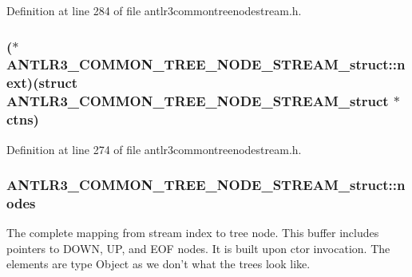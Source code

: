 Definition at line 284 of file antlr3commontreenodestream.\-h.

\hypertarget{struct_a_n_t_l_r3___c_o_m_m_o_n___t_r_e_e___n_o_d_e___s_t_r_e_a_m__struct_a4e17c2be771dd3c3f1a35f9e234cac39}{
\subsubsection[{next}]{($\ast$ A\-N\-T\-L\-R3\-\_\-\-C\-O\-M\-M\-O\-N\-\_\-\-T\-R\-E\-E\-\_\-\-N\-O\-D\-E\-\_\-\-S\-T\-R\-E\-A\-M\-\_\-struct\-::next)(struct {\bf A\-N\-T\-L\-R3\-\_\-\-C\-O\-M\-M\-O\-N\-\_\-\-T\-R\-E\-E\-\_\-\-N\-O\-D\-E\-\_\-\-S\-T\-R\-E\-A\-M\-\_\-struct} $\ast$ctns)}}\label{struct_a_n_t_l_r3___c_o_m_m_o_n___t_r_e_e___n_o_d_e___s_t_r_e_a_m__struct_a4e17c2be771dd3c3f1a35f9e234cac39}


Definition at line 274 of file antlr3commontreenodestream.\-h.

\hypertarget{struct_a_n_t_l_r3___c_o_m_m_o_n___t_r_e_e___n_o_d_e___s_t_r_e_a_m__struct_a9a3951a47f1a5c543d4402e4cb0f64ee}{
\subsubsection[{nodes}]{ A\-N\-T\-L\-R3\-\_\-\-C\-O\-M\-M\-O\-N\-\_\-\-T\-R\-E\-E\-\_\-\-N\-O\-D\-E\-\_\-\-S\-T\-R\-E\-A\-M\-\_\-struct\-::nodes}}\label{struct_a_n_t_l_r3___c_o_m_m_o_n___t_r_e_e___n_o_d_e___s_t_r_e_a_m__struct_a9a3951a47f1a5c543d4402e4cb0f64ee}
The complete mapping from stream index to tree node. This buffer includes pointers to D\-O\-W\-N, U\-P, and E\-O\-F nodes. It is built upon ctor invocation. The elements are type Object as we don't what the trees look like.


